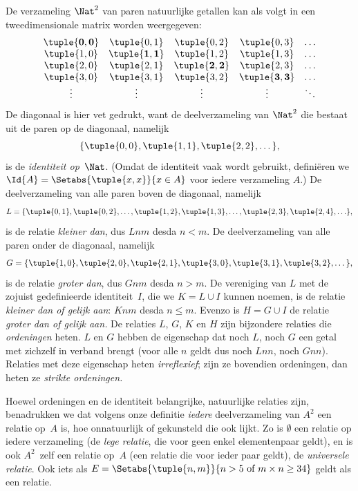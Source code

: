 \documentclass[openany]{memoir}
\begin{document}
\begin{ex}
De verzameling $\Nat^{2}$ van paren natuurlijke getallen kan als volgt
in een tweedimensionale matrix worden weergegeven:
\[
  \begin{array}{ccccc}
  \mathbf{\tuple{ 0,0 }} & \tuple{ 0,1 } &
    \tuple{ 0,2 } & \tuple{ 0,3 } & \ldots\\
  \tuple{ 1,0 } & \mathbf{\tuple{ 1,1 }} &
    \tuple{ 1,2 } & \tuple{ 1,3 } & \ldots\\
  \tuple{ 2,0 } & \tuple{ 2,1 } &
    \mathbf{\tuple{ 2,2 }} & \tuple{ 2,3 } & \ldots\\
  \tuple{ 3,0 } & \tuple{ 3,1 } & \tuple{ 3,2 } &
    \mathbf{\tuple{ 3,3 }} & \ldots\\
  \vdots & \vdots & \vdots & \vdots & \mathbf{\ddots}
  \end{array}
\]
De diagonaal is hier vet gedrukt, want de deelverzameling van $\Nat^2$
die bestaat uit de paren op de diagonaal, namelijk
\[
  \{\tuple{0,0 }, \tuple{ 1,1 }, \tuple{ 2,2 }, \dots\},
  \]
is de \emph{identiteit op}~$\Nat$. (Omdat de identiteit vaak wordt
gebruikt, definiëren we $\Id{A}=\Setabs{\tuple{ x,x }}{x \in A}$ voor
iedere verzameling $A$.) De deelverzameling van alle paren boven de
diagonaal, namelijk
\[
  L = \{\tuple{ 0,1 },\tuple{ 0,2 },\ldots,\tuple{ 1,2 },
  \tuple{ 1,3 }, \dots, \tuple{ 2,3 }, \tuple{ 2,4 },\ldots\},
\]
is de relatie \emph{kleiner dan}, dus $Lnm$ desda $n<m$. De
deelverzameling van alle paren onder de diagonaal, namelijk
\[
  G=\{ \tuple{ 1,0 },\tuple{ 2,0 },\tuple{
    2,1 }, \tuple{ 3,0 },\tuple{ 3,1 },\tuple{ 3,2 }, \dots\},
\]
is de relatie \emph{groter dan}, dus $Gnm$ desda $n>m$. De vereniging
van $L$ met de zojuist gedefinieerde identiteit~$I$, die we $K=L\cup I$
kunnen noemen, is de relatie
\emph{kleiner dan of gelijk aan}: $Knm$ desda $n \le m$. Evenzo is
$H=G \cup I$ de relatie \emph{groter dan of gelijk aan.} De relaties
$L$, $G$, $K$ en $H$ zijn bijzondere relaties die \emph{ordeningen}
heten. $L$ en $G$ hebben de eigenschap dat noch $L$, noch $G$ een getal
met zichzelf in verband brengt (voor alle $n$ geldt dus noch $Lnn$,
noch $Gnn$). Relaties met deze eigenschap heten \emph{irreflexief};
zijn ze bovendien ordeningen, dan heten ze \emph{strikte ordeningen.}
\end{ex}

\begin{explain}
Hoewel ordeningen en de identiteit belangrijke, natuurlijke relaties
zijn, benadrukken we dat volgens onze definitie \emph{iedere}
deelverzameling van $A^{2}$ een relatie op~$A$ is, hoe onnatuurlijk of
gekunsteld die ook lijkt. Zo is $\emptyset$ een relatie op iedere
verzameling (de \emph{lege relatie}, die voor geen enkel elementenpaar
geldt), en is ook $A^{2}$~zelf een relatie op~$A$ (een relatie die voor
ieder paar geldt), de \emph{universele relatie}. Ook iets als
$E=\Setabs{\tuple{n, m}}{n>5 \text{ of } m \times n \ge 34}$ geldt als
een relatie.
\end{explain}
  
\end{document}
